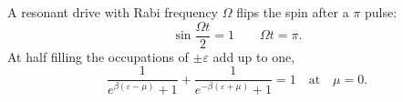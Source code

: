 \documentclass{article}
\begin{document}
A resonant drive with Rabi frequency $\Omega$ flips the spin after a $\pi$ pulse:
\begin{equation}
\sin\frac{\Omega t}{2} = 1 \qquad \Omega t = \pi .
\label{eq:pi}
\end{equation}
At half filling the occupations of $\pm\varepsilon$ add up to one,
\begin{equation}
\frac{1}{e^{\beta(\varepsilon-\mu)}+1} + \frac{1}{e^{-\beta(\varepsilon+\mu)}+1} = 1 \quad \text{at} \quad \mu = 0 .
\label{eq:ph}
\end{equation}
\end{document}

